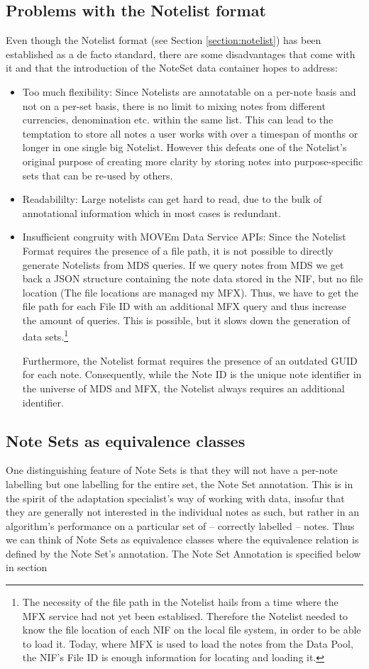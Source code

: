 \subsection{Problems with the Notelist format}
Even though the Notelist format (see Section \ref{section:notelist}) has been established as a de facto standard, there are some disadvantages that come with it and that the introduction of the NoteSet data container hopes to address:
\begin{itemize}
\item Too much flexibility: Since Notelists are annotatable on a per-note basis and not on a per-set basis, there is no limit to mixing notes from different currencies, denomination etc. within the same list. This can lead to the temptation to store all notes a user works with over a timespan of months or longer in one single big Notelist. However this defeats one of the Notelist's original purpose of creating more clarity by storing notes into purpose-specific sets that can be re-used by others. 
\item Readabililty: Large notelists can get hard to read, due to the bulk of annotational information which in most cases is redundant. 
\item Insufficient congruity with MOVEm Data Service APIs: Since the Notelist Format requires the presence of a file path, it is not possible to directly generate Notelists from MDS queries. If we query notes from MDS we get back a JSON structure containing the note data stored in the NIF, but no file location (The file locations are managed my MFX). Thus, we have to get the file path for each File ID with an additional MFX query and thus increase the amount of queries. This is possible, but it slows down the generation of data sets.\footnote{The necessity of the file path in the Notelist hails from a time where the MFX service had not yet been establised. Therefore the Notelist needed to know the file location of each NIF on the local file system, in order to be able to load it. Today, where MFX is used to load the notes from the Data Pool, the NIF's File ID is enough information for locating and loading it.}\par Furthermore, the Notelist format requires the presence of an outdated GUID for each note. Consequently, while the Note ID is the unique note identifier in the universe of MDS and MFX, the Notelist always requires an additional identifier.
\end{itemize}
\subsection{Note Sets as equivalence classes}
One distinguishing feature of Note Sets is that they will not have a per-note labelling but one labelling for the entire set, the Note Set annotation. This is in the spirit of the adaptation specialist's way of working with data, insofar that they are generally not interested in the individual notes as such, but rather in an algorithm's performance on a particular set of -- correctly labelled -- notes. Thus we can think of Note Sets as equivalence classes where the equivalence relation is defined by the Note Set's annotation. The Note Set Annotation is specified below in section 
